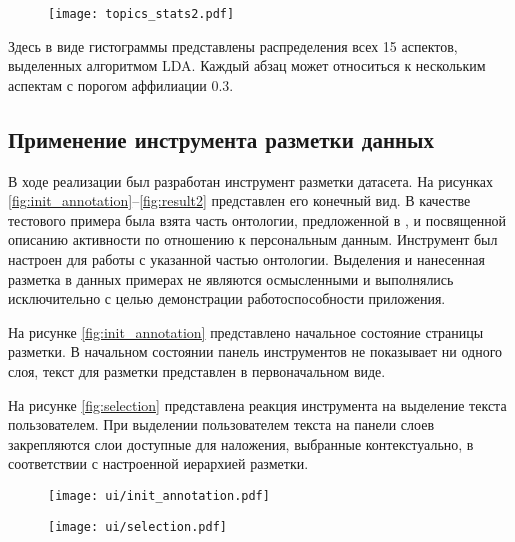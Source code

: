 \documentclass[../main]{subfiles}
\begin{document}
\begin{figure}[H]
    \centering
    {\texttt{[image: topics\_stats2.pdf]}}
    \vspace{-\baselineskip}
\end{figure}

Здесь в виде гистограммы представлены распределения всех 15 аспектов, выделенных алгоритмом LDA. Каждый абзац может относиться к нескольким аспектам с порогом аффилиации 0.3.

\subsection{Применение инструмента разметки данных}
\label{sec:real_proto}

В ходе реализации был разработан инструмент разметки датасета. На рисунках \ref{fig:init_annotation}--\ref{fig:result2} представлен его конечный вид. В качестве тестового примера была взята часть онтологии, предложенной в \cite{P2Onto}, и посвященной описанию активности по отношению к персональным данным. Инструмент был настроен для работы с указанной частью онтологии. Выделения и нанесенная разметка в данных примерах не являются осмысленными и выполнялись исключительно с целью демонстрации работоспособности приложения.

На рисунке \ref{fig:init_annotation} представлено начальное состояние страницы разметки. В начальном состоянии панель инструментов не показывает ни одного слоя, текст для разметки представлен в первоначальном виде.

На рисунке \ref{fig:selection} представлена реакция инструмента на выделение текста пользователем. При выделении пользователем текста на панели слоев закрепляются слои доступные для наложения, выбранные контекстуально, в соответствии с настроенной иерархией разметки.
\begin{figure}[H]
    \centering
    {\texttt{[image: ui/init\_annotation.pdf]}}
    \vspace{-\baselineskip}
\end{figure}
\begin{figure}[H]
    \centering
    {\texttt{[image: ui/selection.pdf]}}
    \vspace{-\baselineskip}
\end{figure}
\end{document}
